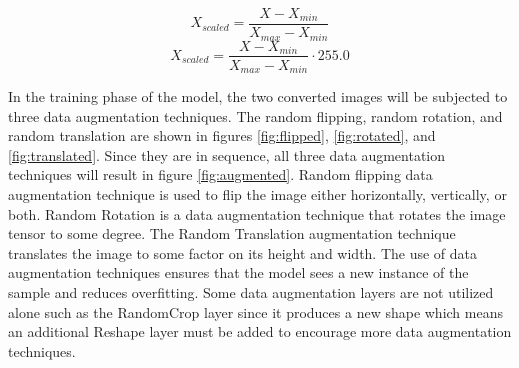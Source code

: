 \begin{equation} \label{eq:mms}
X_{scaled} = \frac{X-X_{min}}{X_{max}-X_{min}}
\end{equation}
\begin{equation} \label{eq:mmsm}
X_{scaled} = \frac{X-X_{min}}{X_{max}-X_{min}} \cdot 255.0
\end{equation}

In the training phase of the model, the two converted images will be subjected to three data augmentation techniques. The random flipping, random rotation, and random translation are shown in figures \ref{fig:flipped}, \ref{fig:rotated}, and \ref{fig:translated}. Since they are in sequence, all three data augmentation techniques will result in figure \ref{fig:augmented}. Random flipping data augmentation technique is used to flip the image either horizontally, vertically, or both. Random Rotation is a data augmentation technique that rotates the image tensor to some degree. The Random Translation augmentation technique translates the image to some factor on its height and width. The use of data augmentation techniques ensures that the model sees a new instance of the sample and reduces overfitting. Some data augmentation layers are not utilized alone such as the RandomCrop layer since it produces a new shape which means an additional Reshape layer must be added to encourage more data augmentation techniques.

